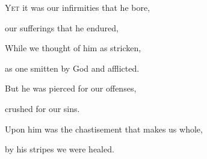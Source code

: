 \lettrine[loversize=0.15,lines=2]{Y}{et} it was our infirmities that he bore,\par
   our sufferings that he endured,\par
\noindent While we thought of him as stricken,\par
   as one smitten by God and afflicted.\par
\noindent But he was pierced for our offenses,\par
   crushed for our sins.\par
\noindent Upon him was the chastisement that makes us whole,\par
   by his stripes we were healed.